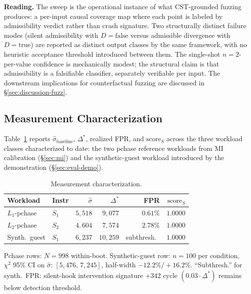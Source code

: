 \documentclass[conference]{IEEEtran}
\newcommand{\sigbase}{\hat{\sigma}_\text{baseline}}
\newcommand{\Dstar}{\Delta^{*}}
\newcommand{\scoreS}{\text{score}_S}
\begin{document}
\textbf{Reading.} The sweep is the operational instance of what
CST-grounded fuzzing produces: a per-input causal coverage map
where each point is labeled by admissibility verdict rather than
crash signature. Two structurally distinct failure modes (silent
admissibility with $D{=}\text{false}$ versus admissible
divergence with $D{=}\text{true}$) are reported as distinct
output classes by the same framework, with no heuristic
acceptance threshold introduced between them. The
single-shot $n{=}2$-per-value confidence is mechanically modest;
the structural claim is that admissibility is a falsifiable
classifier, separately verifiable per input. The downstream
implications for counterfactual fuzzing are discussed in
\S\ref{sec:discussion-fuzz}.

\subsection{Measurement Characterization}\label{sec:eval-meas}

Table~\ref{tab:meas} reports $\sigbase$, $\Dstar$, realized FPR, and
$\scoreS$ across the three workload classes characterized to date:
the two pchase reference workloads from MI calibration
(\S\ref{sec:mi}) and the synthetic-guest workload introduced by the
demonstration (\S\ref{sec:eval-demo}).

\begin{table}[t]
  \caption{Measurement characterization.}
  \label{tab:meas}
  \centering
  \small
  \begin{tabular}{@{}llrrrr@{}}
  \toprule
  Workload      & Instr & $\hat{\sigma}$ & $\Dstar$    & FPR     & $\scoreS$ \\
  \midrule
  $L_1$-pchase  & $S_1$ & $5{,}518$      & $9{,}077$   & $0.61\%$ & $1.0000$ \\
  $L_2$-pchase  & $S_2$ & $4{,}604$      & $7{,}574$   & $2.78\%$ & $1.0000$ \\
  Synth.\ guest & $S_1$ & $6{,}237$      & $10{,}259$  & subthresh.\ & $1.0000$ \\
  \bottomrule
  \end{tabular}

  \vspace{0.3em}
  \footnotesize{Pchase rows: $N{=}998$ within-boot. Synthetic-guest
  row: $n{=}100$ per condition, $\chi^2$ 95\% CI on $\hat{\sigma}$:
  $[5{,}476,\,7{,}245]$, half-width $-12.2\%/+16.2\%$. ``Subthresh.''
  for synth.\ FPR: silent-hook intervention signature $+342$ cycle
  $(0.03\cdot\Dstar)$ remains below detection threshold.}
\end{table}
\end{document}
